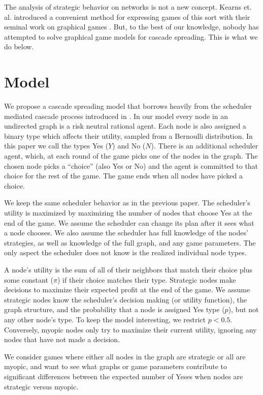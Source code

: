 \documentclass{article}
\begin{document}
The analysis of strategic behavior on networks is not a new
concept. Kearns et. al.  introduced a convenient method for expressing
games of this sort with their seminal work on graphical games
\cite{Kearns01}. But, to the best of our knowledge, nobody has
attempted to solve graphical game models for cascade
spreading.  This is what we do below.


\section{Model}
\label{prob_statement}

We propose a cascade spreading model that borrows heavily from the
scheduler mediated cascade process introduced in
\cite{Chierichetti12}. In our model every node in an undirected graph
is a risk neutral rational agent. Each node is also assigned a binary
type which affects their utility, sampled from a Bernoulli
distribution. In this paper we call the types Yes ($Y$) and No
($N$). There is an additional scheduler agent, which, at each round of
the game picks one of the nodes in the graph. The chosen node picks a
``choice'' (also Yes or No) and the agent is committed to that
choice for the rest of the game. The game ends when all nodes have
picked a choice.

We keep the same scheduler behavior as in the previous paper. The
scheduler's utility is maximized by maximizing the number of nodes
that choose Yes at the end of the game. We assume the scheduler can
change its plan after it sees what a node chooses. We also assume the
scheduler has full knowledge of the nodes' strategies, as well as
knowledge of the full graph, and any game parameters. The only aspect
the scheduler does not know is the realized individual node types.

A node's utility is the sum of all of their neighbors that match their
choice plus some constant ($\pi$) if their choice matches their
type. Strategic nodes make decisions to maximize their expected profit
at the end of the game. We assume strategic nodes know the scheduler's
decision making (or utility function), the graph structure, and the
probability that a node is assigned Yes type ($p$), but not any other
node's type. To keep the model interesting, we restrict $p <
0.5$. Conversely, myopic nodes only try to maximize their current
utility, ignoring any nodes that have not made a decision.

We consider games where either all nodes in the graph are strategic or
all are myopic, and want to see what graphs or game parameters
contribute to significant differences between the expected number of
Yeses when nodes are strategic versus myopic.
\end{document}

